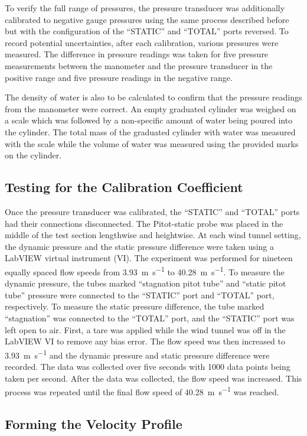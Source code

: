 \documentclass[journal,letterpaper]{IEEEtran}
\begin{document}
To verify the full range of pressures, the pressure transducer was additionally calibrated to negative gauge pressures using the same process described before but with the configuration of the ``STATIC'' and ``TOTAL'' ports reversed.
To record potential uncertainties, after each calibration, various pressures were measured.
The difference in pressure readings was taken for five pressure measurements between the manometer and the pressure transducer in the positive range and five pressure readings in the negative range.

The density of water is also to be calculated to confirm that the pressure readings from the manometer were correct.
An empty graduated cylinder was weighed on a scale which was followed by a non-specific amount of water being poured into the cylinder.
The total mass of the graduated cylinder with water was measured with the scale while the volume of water was measured using the provided marks on the cylinder.

\subsection{Testing for the Calibration Coefficient}

Once the pressure transducer was calibrated, the ``STATIC'' and ``TOTAL'' ports had their connections disconnected.
The Pitot-static probe was placed in the middle of the test section lengthwise and heightwise.
At each wind tunnel setting, the dynamic pressure and the static pressure difference were taken using a LabVIEW virtual instrument (VI).
The experiment was performed for nineteen equally spaced flow speeds from \qty{3.93}{\m\per\s} to \qty{40.28}{\m\per\s}.
To measure the dynamic pressure, the tubes marked ``stagnation pitot tube'' and ``static pitot tube'' pressure were connected to the ``STATIC'' port and ``TOTAL'' port, respectively.
To measure the static pressure difference, the tube marked ``stagnation'' was connected to the ``TOTAL'' port, and the ``STATIC'' port was left open to air.
First, a tare was applied while the wind tunnel was off in the LabVIEW VI to remove any bias error.
The flow speed was then increased to \qty{3.93}{\m\per\s} and the dynamic pressure and static pressure difference were recorded.
The data was collected over five seconds with 1000 data points being taken per second.
After the data was collected, the flow speed was increased.
This process was repeated until the final flow speed of \qty{40.28}{\m\per\s} was reached.

\subsection{Forming the Velocity Profile}
\end{document}
